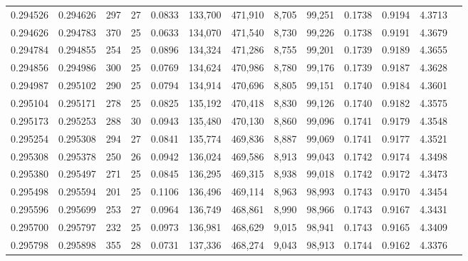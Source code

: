 \begin{tabular}{rrrrrrrrrrrrr}
0.294526 & 0.294626 &   297 &  27 &                                     0.0833 & 133,700 & 471,910 &   8,705 &  99,251 & 0.1738 & 0.9194 & 4.3713 \\
0.294626 & 0.294783 &   370 &  25 &                                     0.0633 & 134,070 & 471,540 &   8,730 &  99,226 & 0.1738 & 0.9191 & 4.3679 \\
0.294784 & 0.294855 &   254 &  25 &                                     0.0896 & 134,324 & 471,286 &   8,755 &  99,201 & 0.1739 & 0.9189 & 4.3655 \\
0.294856 & 0.294986 &   300 &  25 &                                     0.0769 & 134,624 & 470,986 &   8,780 &  99,176 & 0.1739 & 0.9187 & 4.3628 \\
0.294987 & 0.295102 &   290 &  25 &                                     0.0794 & 134,914 & 470,696 &   8,805 &  99,151 & 0.1740 & 0.9184 & 4.3601 \\
0.295104 & 0.295171 &   278 &  25 &                                     0.0825 & 135,192 & 470,418 &   8,830 &  99,126 & 0.1740 & 0.9182 & 4.3575 \\
0.295173 & 0.295253 &   288 &  30 &                                     0.0943 & 135,480 & 470,130 &   8,860 &  99,096 & 0.1741 & 0.9179 & 4.3548 \\
0.295254 & 0.295308 &   294 &  27 &                                     0.0841 & 135,774 & 469,836 &   8,887 &  99,069 & 0.1741 & 0.9177 & 4.3521 \\
0.295308 & 0.295378 &   250 &  26 &                                     0.0942 & 136,024 & 469,586 &   8,913 &  99,043 & 0.1742 & 0.9174 & 4.3498 \\
0.295380 & 0.295497 &   271 &  25 &                                     0.0845 & 136,295 & 469,315 &   8,938 &  99,018 & 0.1742 & 0.9172 & 4.3473 \\
0.295498 & 0.295594 &   201 &  25 &                                     0.1106 & 136,496 & 469,114 &   8,963 &  98,993 & 0.1743 & 0.9170 & 4.3454 \\
0.295596 & 0.295699 &   253 &  27 &                                     0.0964 & 136,749 & 468,861 &   8,990 &  98,966 & 0.1743 & 0.9167 & 4.3431 \\
0.295700 & 0.295797 &   232 &  25 &                                     0.0973 & 136,981 & 468,629 &   9,015 &  98,941 & 0.1743 & 0.9165 & 4.3409 \\
0.295798 & 0.295898 &   355 &  28 &                                     0.0731 & 137,336 & 468,274 &   9,043 &  98,913 & 0.1744 & 0.9162 & 4.3376 \\

\end{tabular}
